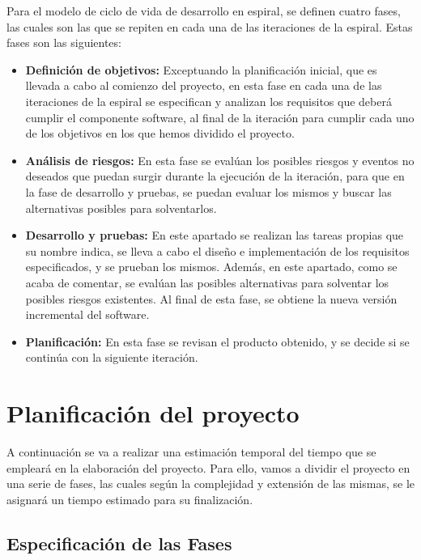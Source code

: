 Para el modelo de ciclo de vida de desarrollo en espiral, se definen cuatro
fases, las cuales son las que se repiten en cada una de las iteraciones de la
espiral. Estas fases son las siguientes:
\begin{itemize}
    \item \textbf{Definición de objetivos:} Exceptuando la planificación inicial,
           que es llevada a cabo al comienzo del proyecto, en esta fase en cada
           una de las iteraciones de la espiral se especifican y analizan los
           requisitos que deberá cumplir el componente software, al final de la
           iteración para cumplir cada uno de los objetivos en los que hemos
           dividido el proyecto.
    \item \textbf{Análisis de riesgos:} En esta fase se evalúan los posibles
           riesgos y eventos no deseados que puedan surgir durante la ejecución
           de la iteración, para que en la fase de desarrollo y pruebas, se
           puedan evaluar los mismos y buscar las alternativas posibles para
           solventarlos.
    \item \textbf{Desarrollo y pruebas:} En este apartado se realizan las
           tareas propias que su nombre indica, se lleva a cabo el diseño e
           implementación de los requisitos especificados, y se prueban los
           mismos. Además, en este apartado, como se acaba de comentar, se
           evalúan las posibles alternativas para solventar los posibles riesgos
           existentes. Al final de esta fase, se obtiene la nueva versión
           incremental del software.
    \item \textbf{Planificación:} En esta fase se revisan el producto obtenido,
           y se decide si se continúa con la siguiente iteración.
\end{itemize}


\section{Planificación del proyecto}
A continuación se va a realizar una estimación temporal del tiempo que se
empleará en la elaboración del proyecto. Para ello, vamos a dividir el proyecto
en una serie de fases, las cuales según la complejidad y extensión de las
mismas, se le asignará un tiempo estimado para su finalización.

\subsection{Especificación de las Fases}

